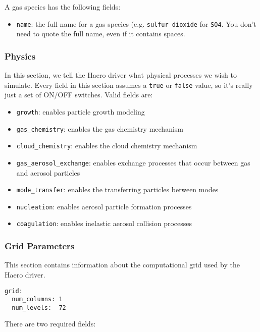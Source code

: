 A gas species has the following fields:

\begin{itemize}
  \item \texttt{name}: the full name for a gas species (e.g.
    \texttt{sulfur dioxide} for \texttt{SO4}. You don't need to quote the
                     full name, even if it contains spaces.
\end{itemize}

\subsubsection*{Physics}

In this section, we tell the Haero driver what physical processes we wish
to simulate. Every field in this section assumes a \texttt{true} or
\texttt{false} value, so it's really just a set of ON/OFF switches. Valid fields
are:

\begin{itemize}
  \item \texttt{growth}: enables particle growth modeling
  \item \texttt{gas\_chemistry}: enables the gas chemistry mechanism
  \item \texttt{cloud\_chemistry}: enables the cloud chemistry mechanism
  \item \texttt{gas\_aerosol\_exchange}: enables exchange processes that occur
                                       between gas and aerosol particles
  \item \texttt{mode\_transfer}: enables the transferring particles between modes
  \item \texttt{nucleation}: enables aerosol particle formation processes
  \item \texttt{coagulation}: enables inelastic aerosol collision processes
\end{itemize}

\subsubsection*{Grid Parameters}

This section contains information about the computational grid used by the
Haero driver.

\begin{verbatim}
grid:
  num_columns: 1
  num_levels:  72
\end{verbatim}

There are two required fields:

